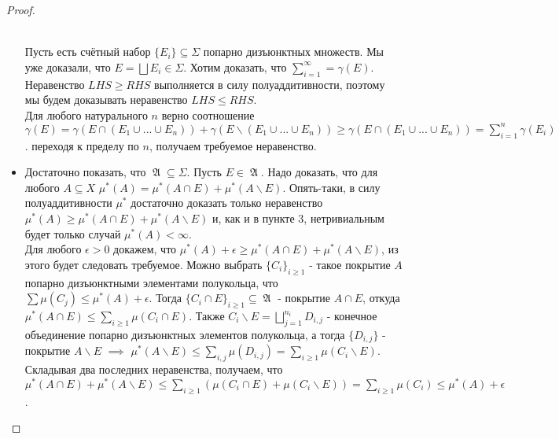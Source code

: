 \documentclass[a4paper]{article}
\theoremstyle{indented}
\theoremstyle{definition}
\theoremstyle{remark}
\DeclareMathOperator{\GA}{\mathfrak{A}}
\begin{document}
\begin{proof}
\begin{itemize}
\\
Пусть есть счётный набор $\{E_i\} \subseteq \Sigma$ попарно дизъюнктных множеств. Мы уже доказали, что $E = \bigsqcup E_i \in \Sigma$. Хотим доказать, что $\sum_{i=1}^{\infty} = \gamma(E)$. Неравенство $LHS \geq RHS$ выполняется в силу полуаддитивности, поэтому мы будем доказывать неравенство $LHS \leq RHS$.
\\
Для любого натурального $n$ верно соотношение $\gamma(E)=\gamma(E \cap (E_1 \cup ... \cup E_n))+\gamma(E \backslash (E_1 \cup ... \cup E_n)) \geq \gamma(E \cap (E_1 \cup ... \cup E_n)) = \sum_{i=1}^n \gamma(E_i)$. переходя к пределу по $n$, получаем требуемое неравенство.
\item Достаточно показать, что $\GA \subseteq \Sigma$. Пусть $E \in \GA$. Надо доказать, что для любого $A \subseteq X$ $\mu^*(A)=\mu^*(A \cap E)+\mu^*(A \backslash E)$. Опять-таки, в силу полуаддитивности $\mu^*$ достаточно доказать только неравенство $\mu^*(A) \geq \mu^*(A \cap E)+\mu^*(A \backslash E)$ и, как и в пункте 3, нетривиальным будет только случай $\mu^*(A) < \infty$. 
\\
Для любого $\epsilon > 0$ докажем, что $\mu^*(A)+\epsilon \geq \mu^*(A \cap E)+\mu^*(A \backslash E)$, из этого будет следовать требуемое. Можно выбрать $\{C_i\}_{i\geq 1}$ - такое покрытие $A$ попарно дизъюнктными элементами полукольца, что $\sum \mu(C_j) \leq \mu^*(A)+\epsilon$. Тогда $\{C_i \cap E\}_{i \geq 1} \subseteq \GA$ - покрытие $A \cap E$, откуда $\mu^*(A \cap E) \leq \sum_{i \geq 1} \mu(C_i \cap E)$. Также $C_i \backslash E=\bigsqcup_{j=1}^{n_i} D_{i, j}$ - конечное объединение попарно дизъюнктных элементов полукольца, а тогда $\{D_{i, j}\}$ - покрытие $A \backslash E$ $\implies$ $\mu^*(A \backslash E) \leq \sum_{i, j} \mu(D_{i, j}) = \sum_{i \geq 1} \mu(C_i \backslash E)$. Складывая два последних неравенства, получаем, что $\mu^*(A \cap E) + \mu^*(A \backslash E) \leq \sum_{i \geq 1} (\mu(C_i \cap E)+\mu(C_i \backslash E)) = \sum_{i \geq 1} \mu(C_i) \leq \mu^*(A)+\epsilon$. 
\end{itemize}
\end{proof}
\end{document}
